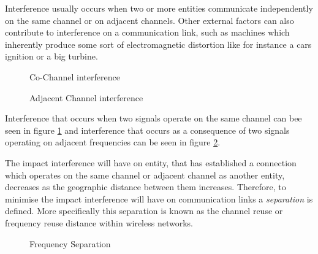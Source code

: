 Interference usually occurs when two or more entities communicate independently on the same channel or on adjacent channels\cite{WirelessCommunications,WirelessDigitalCommunications}. Other external factors can also contribute to interference on a communication link, such as machines which inherently produce some sort of electromagnetic distortion like for instance a cars ignition or a big turbine\cite{WirelessCommunications,WirelessDigitalCommunications}. 
\begin{figure}[t!]
	\begin{centering}
	
	\label{fig:sameinterference}
	\caption{Co-Channel interference}
	\end{centering}
\end{figure}

\begin{figure}[bp!]
	\begin{centering}
	
	\label{fig:adjacentinterference}
	\caption{Adjacent Channel interference}
	\end{centering}
\end{figure}
Interference that occurs when two signals operate on the same channel can bee seen in figure \ref{fig:sameinterference} and interference that occurs as a consequence of two signals operating on adjacent frequencies can be seen in figure \ref{fig:adjacentinterference}.

The impact interference will have on entity, that has established a connection which operates on the same channel or adjacent channel as another entity, decreases as the geographic distance between them increases\cite{WirelessCommunications,WirelessDigitalCommunications,Eisenblatter,InterferenceOrientatedFAP}. Therefore, to minimise the impact interference will have on communication links a \emph{separation} is defined\cite{WirelessCommunications,WirelessDigitalCommunications,Eisenblatter,InterferenceOrientatedFAP}. More specifically this separation is known as the channel reuse or frequency reuse distance within wireless networks\cite{WirelessCommunications,WirelessDigitalCommunications,Eisenblatter,InterferenceOrientatedFAP}.

\begin{figure}[t!]
	\begin{centering}
	
	\caption{Frequency Separation}
	\label{fig:seperationgraph}
	\end{centering}
\end{figure}


